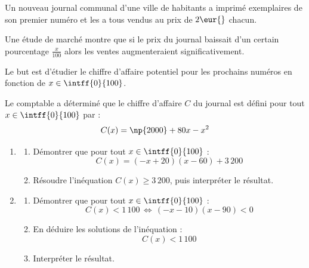 \begin{exo}{}
	Un nouveau journal communal d'une ville de  habitants a imprimé  exemplaires de son premier numéro et les a tous vendus au prix de $2\eur{}$ chacun.

	Une étude de marché montre que si le prix du journal baissait d'un certain pourcentage $\frac{x}{100}$ alors les ventes augmenteraient significativement.

	Le but est d'étudier le chiffre d'affaire potentiel pour les prochains numéros en fonction de $x \in \intff{0}{100}$.

	Le comptable a déterminé que le chiffre d'affaire $C$ du journal est défini pour tout $x \in \intff{0}{100}$ par :
	\[
		C(x) = \np{2000} + 80x - x^2
	\]
	
	\begin{enumerate}
		\item \begin{enumerate}
			      \item Démontrer que pour tout $x \in \intff{0}{100}$ :
			            \[
				            C(x) = (-x + 20)(x - 60) + 3\,200
			            \]

			      \item Résoudre l'inéquation $C(x) \ge 3\,200$, puis interpréter le résultat.
		      \end{enumerate}
		\item \begin{enumerate}
			      \item Démontrer que pour tout $x \in \intff{0}{100}$ :
			            \[
				            C(x) < 1\,100 \,\iff\, (-x - 10)(x - 90) < 0
			            \]

					\item En déduire les solutions de l'inéquation :
			            \[
				            C(x) < 1\,100
			            \]

			      \item Interpréter le résultat.
		      \end{enumerate}
	\end{enumerate}
\end{exo}
